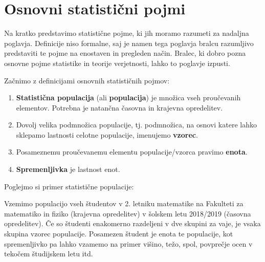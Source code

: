 \section{Osnovni statistični pojmi}

Na kratko predstavimo statistične pojme, ki jih moramo razumeti za nadaljna poglavja. Definicije niso formalne, saj je namen tega poglavja bralcu razumljivo predstaviti te pojme na enostaven in pregleden način. Bralec, ki dobro pozna osnovne pojme statistike in teorije verjetnosti, lahko to poglavje izpusti.

Začnimo z definicijami osnovnih statističnih pojmov:

\begin{definicija}
	\leavevmode
	\begin{enumerate}
		\item \textbf{Statistična populacija} (ali \textbf{populacija}) je množica vseh proučevanih elementov. Potrebna je natančna časovna in krajevna opredelitev.
		\item Dovolj velika podmnožica populacije, tj. podmnožica, na osnovi katere lahko sklepamo lastnosti celotne populacije, imenujemo \textbf{vzorec}.
		\item Posameznemu proučevanemu elementu populacije/vzorca pravimo \textbf{enota}.
		\item \textbf{Spremenljivka} je lastnost enot.
	\end{enumerate}
\end{definicija}

Poglejmo si primer statistične populacije:

\begin{zgled}
	Vzemimo populacijo vseh študentov v 2. letniku matematike na Fakulteti za matematiko in fiziko (krajevna opredelitev) v šolskem letu 2018/2019 (časovna opredelitev). Če so študenti enakomerno razdeljeni v dve skupini za vaje, je vsaka skupina vzorec populacije. Posamezen študent je enota te populacije, kot spremenljivko pa lahko vzamemo na primer višino, težo, spol, povprečje ocen v tekočem študijskem letu itd.
\end{zgled}

\pagebreak


